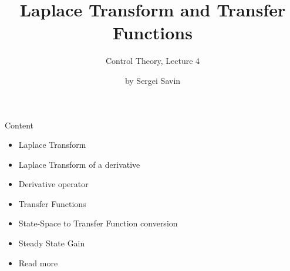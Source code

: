 \documentclass{beamer}
\title{Laplace Transform and Transfer Functions}
\subtitle{Control Theory, Lecture 4}
\author{by Sergei Savin}
\date{\mydate}
\begin{document}
\maketitle


\begin{frame}{Content}

\begin{itemize}
\item Laplace Transform
\item Laplace Transform of a derivative
\item Derivative operator
\item Transfer Functions
\item State-Space to Transfer Function conversion
\item Steady State Gain
\item Read more
\end{itemize}

\end{frame}




%
%
%
%
\end{document}
